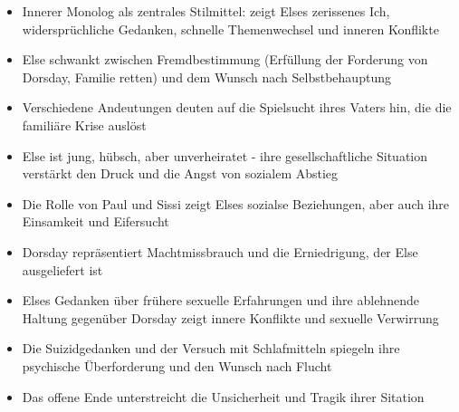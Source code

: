 \begin{itemize}
    \item Innerer Monolog als zentrales Stilmittel: zeigt Elses zerissenes Ich, widersprüchliche Gedanken, schnelle Themenwechsel und inneren Konflikte
    \item Else schwankt zwischen Fremdbestimmung (Erfüllung der Forderung von Dorsday, Familie retten) und dem Wunsch nach Selbstbehauptung
    \item Verschiedene Andeutungen deuten auf die Spielsucht ihres Vaters hin, die die familiäre Krise auslöst
    \item Else ist jung, hübsch, aber unverheiratet - ihre gesellschaftliche Situation verstärkt den Druck und die Angst von sozialem Abstieg
    \item Die Rolle von Paul und Sissi zeigt Elses sozialse Beziehungen, aber auch ihre Einsamkeit und Eifersucht
    \item Dorsday repräsentiert Machtmissbrauch und die Erniedrigung, der Else ausgeliefert ist
    \item Elses Gedanken über frühere sexuelle Erfahrungen und ihre ablehnende Haltung gegenüber Dorsday zeigt innere Konflikte und sexuelle Verwirrung
    \item Die Suizidgedanken und der Versuch mit Schlafmitteln spiegeln ihre psychische Überforderung und den Wunsch nach Flucht
    \item Das offene Ende unterstreicht die Unsicherheit und Tragik ihrer Sitation
\end{itemize}

